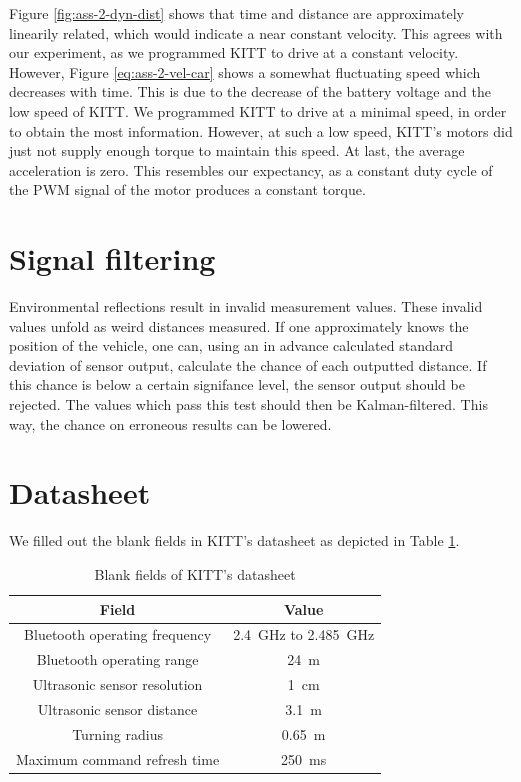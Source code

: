 \documentclass[11pt,titlepage]{report}
\begin{document}
Figure \ref{fig:ass-2-dyn-dist} shows that time and distance are approximately linearily related, which would indicate a near constant velocity. This agrees with our experiment, as we programmed KITT to drive at a constant velocity. However, Figure \ref{eq:ass-2-vel-car} shows a somewhat fluctuating speed which decreases with time. This is due to the decrease of the battery voltage and the low speed of KITT. We programmed KITT to drive at a minimal speed, in order to obtain the most information. However, at such a low speed, KITT's motors did just not supply enough torque to maintain this speed. At last, the average acceleration is zero. This resembles our expectancy, as a constant duty cycle of the PWM signal of the motor produces a constant torque.

\section{Signal filtering}
Environmental reflections result in invalid measurement values. These invalid values unfold as weird distances measured. If one approximately knows the position of the vehicle, one can, using an in advance calculated standard deviation of sensor output, calculate the chance of each outputted distance. If this chance is below a certain signifance level, the sensor output should be rejected. The values which pass this test should then be Kalman-filtered. This way, the chance on erroneous results can be lowered.

\section{Datasheet}
We filled out the blank fields in KITT's datasheet as depicted in Table \ref{tab:ass2-datasheet}.

\begin{table}[H]
	\centering
	\caption{Blank fields of KITT's datasheet}
	\label{tab:ass2-datasheet}
	\begin{tabular}{c c}
		\hline\hline
		Field & Value \\
		\hline
		Bluetooth operating frequency & \SI{2.4}{GHz} to \SI{2.485}{GHz} \\
		Bluetooth operating range & \SI{24}{m} \\
		Ultrasonic sensor resolution & \SI{1}{cm} \\
		Ultrasonic sensor distance & \SI{3.1}{m} \\
		Turning radius & \SI{0.65}{m} \\
		Maximum command refresh time & \SI{250}{ms} \\
		\hline
		\end{tabular}
\end{table}
\end{document}
